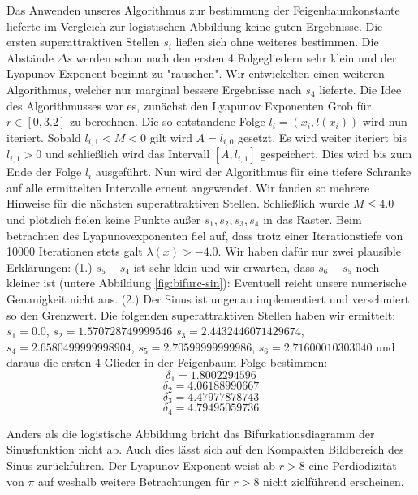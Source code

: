 \documentclass{scrartcl}
\begin{document}
Das Anwenden unseres Algorithmus zur bestimmung der Feigenbaumkonstante lieferte im Vergleich zur logistischen Abbildung keine guten Ergebnisse. Die ersten superattraktiven Stellen $s_i$ ließen sich ohne weiteres bestimmen. Die Abstände $\Delta s$ werden schon nach den ersten 4 Folgegliedern sehr klein und der Lyapunov Exponent beginnt zu "rauschen". 
Wir entwickelten einen weiteren Algorithmus, welcher nur marginal bessere Ergebnisse nach $s_4$ lieferte. Die Idee des Algorithmusses war es, zunächst den Lyapunov Exponenten Grob für $r\in [0,3.2]$ zu berechnen. 
Die so entstandene Folge $l_i=(x_i, l(x_i))$ wird nun iteriert. Sobald $l_{i,1} < M < 0$ gilt wird $A=l_{i,0}$ gesetzt. Es wird weiter iteriert bis $l_{i,1} > 0$ und schließlich wird das Intervall $[A, l_{i,1}]$ gespeichert. Dies wird bis zum Ende der Folge $l_i$ ausgeführt. 
Nun wird der Algorithmus für eine tiefere Schranke auf alle ermittelten Intervalle erneut angewendet. 
Wir fanden so mehrere Hinweise für die nächsten superattraktiven Stellen. 
Schließlich wurde $M \leq 4.0$ und plötzlich fielen keine Punkte außer $s_1, s_2, s_3, s_4$ in das Raster. Beim betrachten des Lyapunovexponenten fiel auf, dass trotz einer Iterationstiefe von 10000 Iterationen stets galt $\lambda(x)>-4.0$. 
Wir haben dafür nur zwei plausible Erklärungen: 
(1.) $s_5-s_4$ ist sehr klein und wir erwarten, dass $s_6-s_5$ noch kleiner ist (untere Abbildung \ref{fig:bifurc-sin}): Eventuell reicht unsere numerische Genauigkeit nicht aus. 
(2.) Der Sinus ist ungenau implementiert und verschmiert so den Grenzwert. 
Die folgenden superattraktiven Stellen haben wir ermittelt: $s_1=0.0$, $s_2=1.570728749999546$ $s_3=2.4432446071429674$, $s_4=2.6580499999998904$, $s_5=2.70599999999986$, $s_6=2.71600010303040$ und daraus die ersten 4 Glieder in der Feigenbaum Folge bestimmen:
$$\delta_1=1.8002294596$$
$$\delta_2=4.06188990667$$
$$\delta_3=4.47977878743$$
$$\delta_4=4.79495059736$$

Anders als die logistische Abbildung bricht das Bifurkationsdiagramm der Sinusfunktion nicht ab. Auch dies lässt sich auf den Kompakten Bildbereich des Sinus zurückführen. Der Lyapunov Exponent weist ab $r>8$ eine Perdiodizität von $\pi$ auf weshalb weitere Betrachtungen für $r>8$ nicht zielführend erscheinen.
\end{document}
